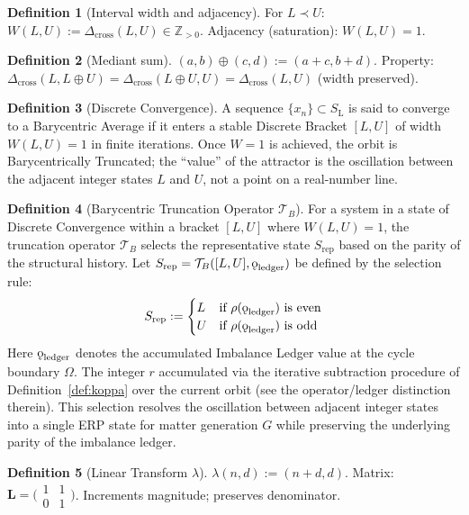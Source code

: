 \documentclass[11pt, letterpaper]{article}
\newcommand{\Z}{\mathbb{Z}}
\newcommand{\SL}{S_{\mathrm{L}}}
\newcommand{\lop}{\lambda}
\newcommand{\med}{\oplus}
\newcommand{\rank}{\rho}
\newcommand{\Dcross}{\Delta_{\mathrm{cross}}}
\newcommand{\koppa}{\mathbin{\text{\rm\k{o}}}}
\theoremstyle{definition}
\newtheorem{definition}{Definition}[section]
\theoremstyle{plain}
\begin{document}
\begin{definition}[Interval width and adjacency]\label{def:width}
For $L\prec U$: $W(L,U):=\Dcross(L,U)\in\Z_{>0}$.
Adjacency (saturation): $W(L,U)=1$.
\end{definition}

\begin{definition}[Mediant sum]\label{def:mediant}
$(a,b)\med(c,d):=(a+c,b+d)$.  Property:
$\Dcross(L,L\med U)=\Dcross(L\med U,U)=\Dcross(L,U)$ (width preserved).
\end{definition}

\begin{definition}[Discrete Convergence]\label{def:discrete-convergence}
A sequence $\{x_n\}\subset\SL$ is said to converge to a
Barycentric Average if it enters a stable Discrete Bracket
$[L,U]$ of width $W(L,U)=1$ in finite iterations.  Once $W=1$ is achieved,
the orbit is Barycentrically Truncated; the ``value'' of the
attractor is the oscillation between the adjacent integer states $L$ and $U$,
not a point on a real-number line.
\end{definition}

\begin{definition}[Barycentric Truncation Operator $\mathcal{T}_B$]
\label{def:bary-trunc}
For a system in a state of Discrete Convergence within a bracket $[L,U]$
where $W(L,U)=1$, the truncation operator $\mathcal{T}_B$ selects the
representative state $S_{\mathrm{rep}}$ based on the parity of the structural
history.  Let
$S_{\mathrm{rep}}=\mathcal{T}_B([L,U],\koppa_{\mathrm{ledger}})$ be defined
by the selection rule:
\[
S_{\mathrm{rep}}:=\begin{cases}
  L & \text{if }\rank(\koppa_{\mathrm{ledger}})\text{ is even}\\
  U & \text{if }\rank(\koppa_{\mathrm{ledger}})\text{ is odd}
\end{cases}
\]
Here $\koppa_{\mathrm{ledger}}$ denotes the accumulated Imbalance Ledger
value at the cycle boundary $\Omega$. The integer $r$ accumulated via the
iterative subtraction procedure of Definition~\ref{def:koppa} over the
current orbit (see the operator/ledger distinction therein).  This selection
resolves the oscillation between adjacent integer states into a single ERP
state for matter generation $G$ while preserving the underlying parity of the
imbalance ledger.
\end{definition}

\begin{definition}[Linear Transform $\lop$]\label{def:lop}
$\lop(n,d):=(n+d,d)$.
Matrix: $\mathbf{L}=\bigl(\begin{smallmatrix}1&1\\0&1\end{smallmatrix}\bigr)$.
Increments magnitude; preserves denominator.
\end{definition}
\end{document}
